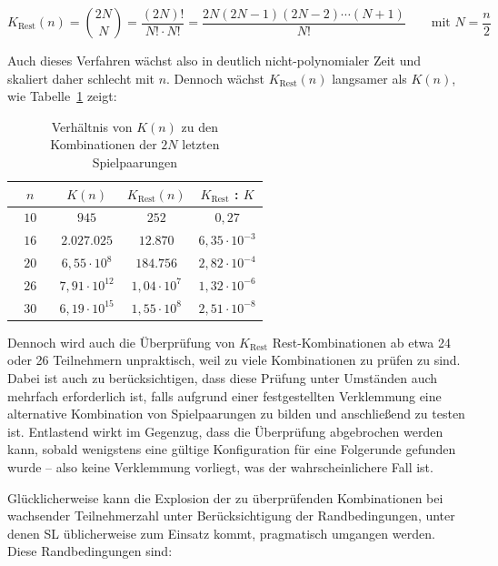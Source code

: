 \documentclass[DIV=15, 10pt]{scrartcl}
\begin{document}
\begin{equation}
K_{\text{Rest}}(n) = {{2N}\choose{N}} = \frac{(2N)!}{N! \cdot N!} = \frac{2N(2N-1)(2N-2)\cdots(N+1)}{N!}
\qquad \text{mit }N = \frac{n}{2}
\end{equation}

Auch dieses Verfahren wächst also in deutlich nicht-polynomialer Zeit und skaliert daher schlecht mit $n$. Dennoch wächst $K_{\text{Rest}}(n)$ langsamer als $K(n)$, wie Tabelle~\ref{tabRestkombinationen} zeigt:

\begin{table}[htbp]
\begin{center}
\begin{tabular}{cccc}
\toprule
$\quad n \quad$ & $K(n)$ & $K_{\text{Rest}}(n)$ & $K_{\text{Rest}}$ : $K$\\[1mm]
\midrule
$10$ & $945$ & $252$ & $0,27$ \\[1mm]
$16$ & $2.027.025$ & $12.870$ & $6,35 \cdot 10^{-3}$\\[1mm]
$20$ & $6,55 \cdot 10^8$ & $184.756$ & $2,82 \cdot 10^{-4}$\\[1mm]
$26$ & $7,91 \cdot 10^{12}$ & $1,04 \cdot 10^7$ & $1,32 \cdot 10^{-6}$\\[1mm]
$30$ & $6,19 \cdot 10^{15}$ & $1,55 \cdot 10^8$ & $2,51 \cdot 10^{-8}$\\[1mm]
\bottomrule
\end{tabular}
\caption{Verhältnis von $K(n)$ zu den Kombinationen der $2N$ letzten Spielpaarungen}
\label{tabRestkombinationen}
\end{center}
\end{table}

Dennoch wird auch die Überprüfung von $K_\text{Rest}$ Rest-Kombinationen ab etwa 24 oder 26 Teilnehmern unpraktisch, weil zu viele Kombinationen zu prüfen zu sind. Dabei ist auch zu berücksichtigen, dass diese Prüfung unter Umständen auch mehrfach erforderlich ist, falls aufgrund einer festgestellten Verklemmung eine alternative Kombination von Spielpaarungen zu bilden und anschließend zu testen ist. Entlastend wirkt im Gegenzug, dass die Überprüfung abgebrochen werden kann, sobald wenigstens eine gültige Konfiguration für eine Folgerunde gefunden wurde -- also keine Verklemmung vorliegt, was der wahrscheinlichere Fall ist.


Glücklicherweise kann die Explosion der zu überprüfenden Kombinationen bei wachsender Teilnehmerzahl unter Berücksichtigung der Randbedingungen, unter denen SL üblicherweise zum Einsatz kommt, pragmatisch umgangen werden. Diese Randbedingungen sind:
\end{document}
